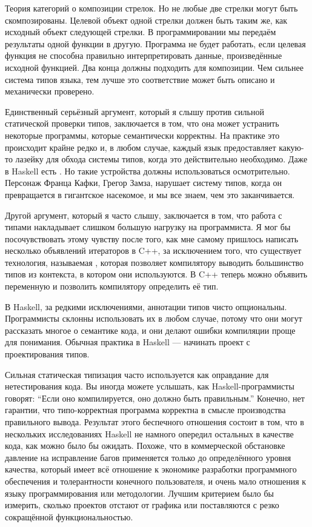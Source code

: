 Теория категорий о композиции стрелок. Но не любые две стрелки могут быть
скомпозированы. Целевой объект одной стрелки должен быть таким же, как исходный
объект следующей стрелки. В программировании мы передаём результаты
одной функции в другую. Программа не будет работать, если целевая
функция не способна правильно интерпретировать данные, произведённые
исходной функцией. Два конца должны подходить для композиции. Чем
сильнее система типов языка, тем лучше это соответствие может быть
описано и механически проверено.

Единственный серьёзный аргумент, который я слышу против сильной статической проверки типов,
заключается в том, что она может устранить некоторые программы, которые семантически корректны. На
практике это происходит крайне редко и, в любом случае, каждый язык
предоставляет какую-то лазейку для обхода системы типов, когда это
действительно необходимо. Даже в Haskell есть . Но такие
устройства должны использоваться осмотрительно. Персонаж Франца Кафки, Грегор
Замза, нарушает систему типов, когда он превращается в гигантское насекомое,
и мы все знаем, чем это заканчивается.

Другой аргумент, который я часто слышу, заключается в том, что работа с типами накладывает слишком
большую нагрузку на программиста. Я мог бы посочувствовать этому чувству
после того, как мне самому пришлось написать несколько объявлений итераторов в C++,
за исключением того, что существует технология, называемая , которая позволяет
компилятору выводить большинство типов из контекста, в котором они
используются. В C++ теперь можно объявить переменную  и позволить
компилятору определить её тип.

В Haskell, за редкими исключениями, аннотации типов чисто
опциональны. Программисты склонны использовать их в любом случае, потому что они могут рассказать
многое о семантике кода, и они делают ошибки компиляции проще для
понимания. Обычная практика в Haskell --- начинать проект с
проектирования типов. 

Сильная статическая типизация часто используется как оправдание для нетестирования
кода. Вы иногда можете услышать, как Haskell-программисты говорят: ``Если оно
компилируется, оно должно быть правильным.'' Конечно, нет гарантии, что
типо-корректная программа корректна в смысле производства правильного
вывода. Результат этого беспечного отношения состоит в том, что в нескольких исследованиях
Haskell не намного опередил остальных в качестве кода, как можно
было бы ожидать. Похоже, что в коммерческой обстановке давление на
исправление багов применяется только до определённого уровня качества, который имеет
всё отношение к экономике разработки программного обеспечения и
толерантности конечного пользователя, и очень мало отношения к языку
программирования или методологии. Лучшим критерием было бы измерить, сколько
проектов отстают от графика или поставляются с резко сокращённой
функциональностью.

